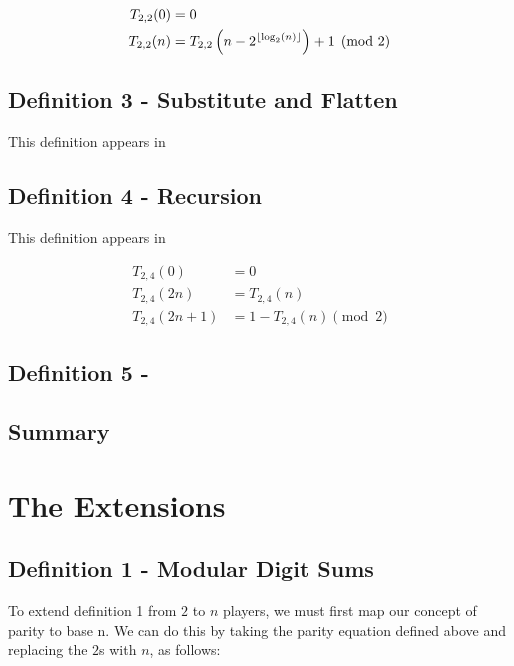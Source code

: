 \documentclass[conference]{IEEEtran}
\begin{document}
\begin{equation}
    \begin{aligned}
        T_{2,2}(0) &= 0 \\
        T_{2,2}(n) &= T_{2,2}\left(n - 2^{\left\lfloor \log_2(n) \right\rfloor}\right) + 1 \pmod{2}
    \end{aligned}
\end{equation}

\subsection{Definition 3 - Substitute and Flatten}

This definition appears in \cite{Spiegelhofer_2020, Kolář-Nori_1991}

\subsection{Definition 4 - Recursion}

This definition appears in \cite{Kolář-Nori_1991}

\begin{equation}
    \begin{aligned}
        T_{2,4}(0) &= 0 \\
        T_{2,4}(2n) &= T_{2,4}(n) \\
        T_{2,4}(2n+1) &= 1 - T_{2,4}(n) \pmod{2}
    \end{aligned}
\end{equation}

\subsection{Definition 5 - }

\subsection{Summary}

\section{The Extensions}

\subsection{Definition 1 - Modular Digit Sums}

To extend definition 1 from $2$ to $n$ players, we must first map our concept of parity to base n. We can do this by taking the parity equation defined above and replacing the $2$s with $n$, as follows:
\end{document}
